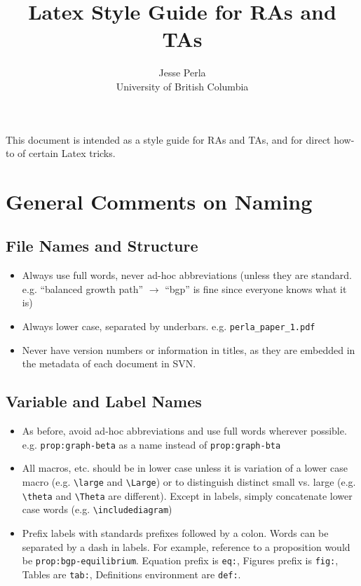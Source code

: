 \documentclass[12pt,etk-draft]{etk-article}
\begin{document}
	\title{Latex Style Guide for RAs and TAs}
	\author{Jesse Perla \\ University of British Columbia}
\date{}

	\maketitle %


This document is intended as a style guide for RAs and TAs, and for direct how-to of certain Latex tricks.	
\section{General Comments on Naming}
\subsection{File Names and Structure}
\begin{itemize}
\item Always use full words, never ad-hoc abbreviations (unless they are standard.  e.g. ``balanced growth path'' $\to$ ``bgp'' is fine since everyone knows what it is)
\item Always lower case, separated by underbars.  e.g. \verb!perla_paper_1.pdf!
\item Never have version numbers or information in titles, as they are embedded in the metadata of each document in SVN.
\end{itemize}
\subsection{Variable and Label Names}
\begin{itemize}
\item As before, avoid ad-hoc abbreviations and use full words wherever possible.  e.g. \verb!prop:graph-beta! as a name instead of \verb!prop:graph-bta!
\item All macros, etc. should be in lower case unless it is variation of a lower case macro (e.g. \verb!\large! and \verb!\Large!) or to distinguish distinct small vs. large (e.g. \verb!\theta! and \verb!\Theta! are different).  Except in labels, simply concatenate lower case words (e.g. \verb!\includediagram!)
\item Prefix labels with standards prefixes followed by a colon.  Words can be separated by a dash in labels.  For example, reference to a proposition would be \verb!prop:bgp-equilibrium!.  Equation prefix is \verb!eq:!, Figures prefix is \verb!fig:!, Tables are \verb!tab:!, Definitions environment are \verb!def:!.
\end{itemize}
\end{document}
